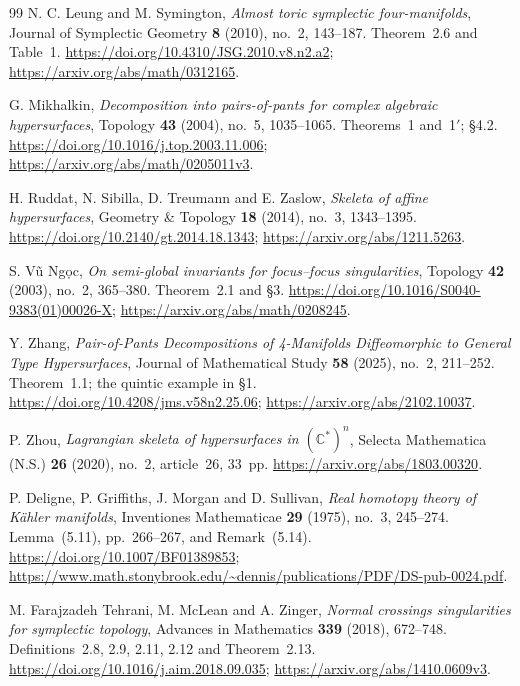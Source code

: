 \begin{thebibliography}{99}
N. C. Leung and M. Symington,
\emph{Almost toric symplectic four-manifolds},
Journal of Symplectic Geometry \textbf{8} (2010), no.~2, 143--187.
Theorem~2.6 and Table~1.
\url{https://doi.org/10.4310/JSG.2010.v8.n2.a2};
\url{https://arxiv.org/abs/math/0312165}.

G. Mikhalkin,
\emph{Decomposition into pairs-of-pants for complex algebraic hypersurfaces},
Topology \textbf{43} (2004), no.~5, 1035--1065.
Theorems~1 and~1$'$; \S4.2.
\url{https://doi.org/10.1016/j.top.2003.11.006};
\url{https://arxiv.org/abs/math/0205011v3}.

H. Ruddat, N. Sibilla, D. Treumann and E. Zaslow,
\emph{Skeleta of affine hypersurfaces},
Geometry \& Topology \textbf{18} (2014), no.~3, 1343--1395.
\url{https://doi.org/10.2140/gt.2014.18.1343};
\url{https://arxiv.org/abs/1211.5263}.

S. Vũ Ngọc,
\emph{On semi-global invariants for focus--focus singularities},
Topology \textbf{42} (2003), no.~2, 365--380.
Theorem~2.1 and \S3.
\url{https://doi.org/10.1016/S0040-9383(01)00026-X};
\url{https://arxiv.org/abs/math/0208245}.

Y. Zhang,
\emph{Pair-of-Pants Decompositions of 4-Manifolds Diffeomorphic to General Type Hypersurfaces},
Journal of Mathematical Study \textbf{58} (2025), no.~2, 211--252.
Theorem~1.1; the quintic example in \S1.
\url{https://doi.org/10.4208/jms.v58n2.25.06};
\url{https://arxiv.org/abs/2102.10037}.

P. Zhou,
\emph{Lagrangian skeleta of hypersurfaces in $(\mathbb C^*)^n$},
Selecta Mathematica (N.S.) \textbf{26} (2020), no.~2, article~26, 33~pp.
\url{https://arxiv.org/abs/1803.00320}.


P. Deligne, P. Griffiths, J. Morgan and D. Sullivan,
\emph{Real homotopy theory of K\"ahler manifolds},
Inventiones Mathematicae \textbf{29} (1975), no.~3, 245--274.
Lemma~(5.11), pp.~266--267, and Remark~(5.14).
\url{https://doi.org/10.1007/BF01389853};
\url{https://www.math.stonybrook.edu/~dennis/publications/PDF/DS-pub-0024.pdf}.

M. Farajzadeh Tehrani, M. McLean and A. Zinger,
\emph{Normal crossings singularities for symplectic topology},
Advances in Mathematics \textbf{339} (2018), 672--748.
Definitions~2.8, 2.9, 2.11, 2.12 and Theorem~2.13.
\url{https://doi.org/10.1016/j.aim.2018.09.035};
\url{https://arxiv.org/abs/1410.0609v3}.


\end{thebibliography}
